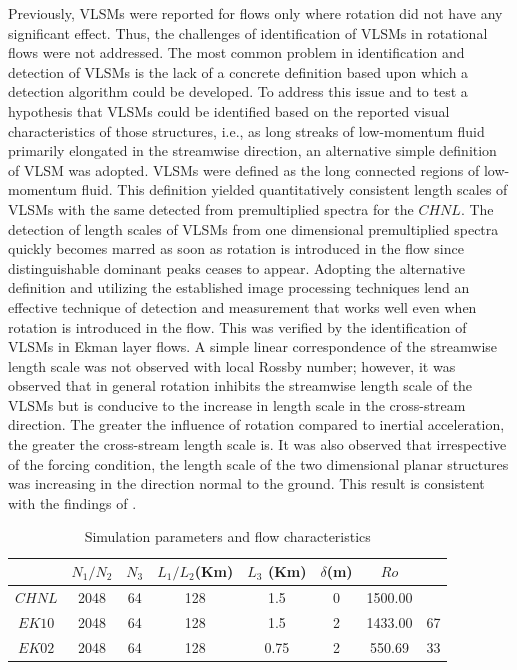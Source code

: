 Previously, VLSMs were reported for flows only where rotation did not have any significant effect. Thus, the challenges of identification of VLSMs in rotational flows were not addressed. The most common problem in identification and detection of VLSMs is the lack of a concrete definition based upon which a detection algorithm could be developed. To address this issue and to test a hypothesis that VLSMs could be identified based on the reported visual characteristics of those structures, i.e., as long streaks of low-momentum fluid primarily elongated in the streamwise direction, an alternative simple definition of VLSM was adopted. VLSMs were defined as the long connected regions of low-momentum fluid. This definition yielded quantitatively consistent length scales of VLSMs with the same detected from premultiplied spectra for the $CHNL$. The detection of length scales of VLSMs from one dimensional premultiplied spectra quickly becomes marred as soon as rotation is introduced in the flow since distinguishable dominant peaks ceases to appear. Adopting the alternative definition and utilizing the established image processing techniques lend an effective technique of detection and measurement that works well even when rotation is introduced in the flow. This was verified by the identification of VLSMs in Ekman layer flows. A simple linear correspondence of the streamwise length scale was not observed with local Rossby number; however, it was observed that in general rotation inhibits the streamwise length scale of the VLSMs but is conducive to the increase in length scale in the cross-stream direction. The greater the influence of rotation compared to inertial acceleration, the greater the cross-stream length scale is. It was also observed that irrespective of the forcing condition, the length scale of the two dimensional planar structures was increasing in the direction normal to the ground. This result is consistent with the findings of \citet{de_silva_hutchins_jfm_2016}. 



\clearpage

\begin{table}
	\caption{Simulation parameters and flow characteristics}
	\centering
	\begin{tabular}{ c c c c c c c c}
		\hline 
		       & $N_1/N_2$ & $N_3$ & $L_1/L_2$(Km)  & $L_3$ (Km) & $\delta$(m)   & $Ro$ \\
		\hline  
		$CHNL$ & 2048      &  64   & 128            &  1.5 & 0   & 1500.00       &     \\
		$EK10$ & 2048      &  64   & 128            &  1.5 & 2   & 1433.00       & 67   \\
		$EK02$ & 2048      &  64   & 128            &  0.75 & 2  & 550.69        & 33  \\
		\hline 
		\hline 
	\end{tabular}
	\label{tab:sim_param}
\end{table}

